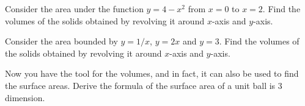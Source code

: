 \documentclass[Calculus 1 Recitation.tex]{subfiles}
\begin{document}
\begin{myleftlinebox}
	Consider the area under the function $y=4-x^2$ from $x=0$ to $x=2$. Find the volumes of the solids obtained by revolving it around $x$-axis and $y$-axis.
	\tcblower
	\vspace{2em}
\end{myleftlinebox}

\begin{myleftlinebox}
	Consider the area bounded by $y=1/x$, $y=2x$ and $y=3$. Find the volumes of the solids obtained by revolving it around $x$-axis and $y$-axis.
	\tcblower
	\vspace{2em}
\end{myleftlinebox}

\begin{myleftlinebox}
	Now you have the tool for the volumes, and in fact, it can also be used to find the surface areas. Derive the formula of the surface area of a unit ball is 3 dimension.
	\tcblower
	\vspace{2em}
\end{myleftlinebox}
\end{document}
